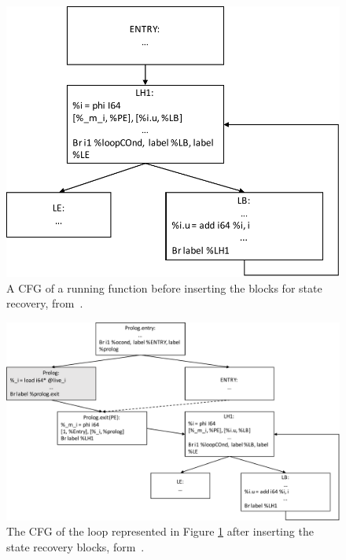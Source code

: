 \begin{figure}[h]
\centering
\includegraphics[scale=0.5]{Figures/FCFG.pdf}
\decoRule
\caption[A CFG of a running function before inserting the blocks for state recovery]{A CFG of a running function before inserting the blocks for state recovery, from~\cite{lameed2013modular}.}
\label{FCFG}
\end{figure}

\begin{figure}[h]
\centering
\includegraphics[scale=0.5]{Figures/FOptCFG.pdf}
\decoRule
\caption[The CFG of the loop represented in Figure \ref{FCFG} after inserting the state recovery blocks, form~\cite{lameed2013modular}.]{The CFG of the loop represented in Figure \ref{FCFG} after inserting the state recovery blocks, form~\cite{lameed2013modular}.}
\label{InstFCFG}
\end{figure}\\


